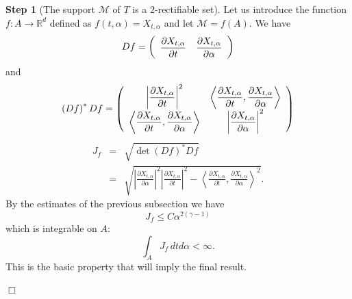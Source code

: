 \documentclass{article}
\newenvironment{proof}[1][Proof]{{\sc #1.} }{\hfill $\Box$}
\begin{document}
\begin{proof}
\textbf{Step 1} (The support $\mathcal{M}$ of $T$ is a $2$-rectifiable set).
Let us introduce the function $f:A\rightarrow \mathbb{R}^{d}$ defined as 
$
f(t,\alpha )=X_{t,\alpha }
$
and let $\mathcal{M}=f(A)$. We have 
\begin{equation*}
Df=\left( 
\begin{array}{cc}
\displaystyle \frac{\partial X_{t,\alpha }}{\partial t} & \displaystyle\frac{\partial X_{t,\alpha }}{%
\partial \alpha }
\end{array}
\right) 
\end{equation*}
and 
\begin{equation*}
\left( Df\right) ^{\ast }Df=\left( 
\begin{array}{cc}
\displaystyle\left| \frac{\partial X_{t,\alpha }}{\partial t}\right| ^{2} & \displaystyle\left\langle 
\frac{\partial X_{t,\alpha }}{\partial t},\frac{\partial X_{t,\alpha }}{%
\partial \alpha }\right\rangle  \\ 
\displaystyle\left\langle \frac{\partial X_{t,\alpha }}{\partial t},\frac{\partial
X_{t,\alpha }}{\partial \alpha }\right\rangle  & \displaystyle\left| \frac{\partial
X_{t,\alpha }}{\partial \alpha }\right| ^{2}
\end{array}
\right) 
\end{equation*}
\begin{eqnarray*}
J_{f} &=&\sqrt{\det \left( Df\right) ^{\ast }Df} \\
&=&\sqrt{\left| \frac{\partial X_{t,\alpha }}{\partial \alpha }\right|
^{2}\left| \frac{\partial X_{t,\alpha }}{\partial t}\right|
^{2}-\left\langle \frac{\partial X_{t,\alpha }}{\partial t},\frac{\partial
X_{t,\alpha }}{\partial \alpha }\right\rangle ^{2}}.
\end{eqnarray*}
By the estimates of the previous subsection we have 
\begin{equation*}
J_{f}\leq C\alpha ^{2\left( \gamma -1\right) }
\end{equation*}
which is integrable on $A$: 
\begin{equation*}
\int_{A}J_{f}\,dtd\alpha <\infty .
\end{equation*}
This is the basic property that will imply the final result.


\end{proof}
\end{document}
